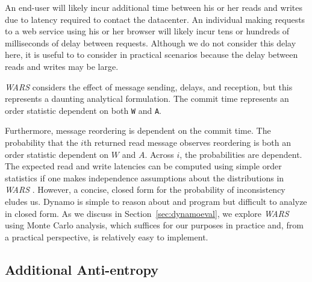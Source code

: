 \documentclass{vldb}
\begin{document}
An end-user will likely incur additional time between his or her
reads and writes due to latency required to contact the datacenter.
An individual making requests to a web service using his or her
browser will likely incur tens or hundreds of milliseconds of delay
between requests.  Although we do not consider this delay here, it is
useful to to consider in practical scenarios because the delay between
reads and writes may be large.

\textit{WARS} considers the effect of message sending, delays, and
reception, but this represents a daunting analytical formulation.  The
commit time represents an order statistic dependent on both \texttt{W}
and \texttt{A}.  Furthermore, message reordering is
dependent on the commit time.  The probability that the $i$th returned
read message observes reordering is both an order statistic dependent
on $W$ and $A$.  Across $i$, the probabilities are dependent.  The
expected read and write latencies can be computed using simple order
statistics if one makes independence assumptions about the
distributions in \textit{WARS} .  However, a concise, closed form for
the probability of inconsistency eludes us.  Dynamo is simple to
reason about and program but difficult to analyze in closed form.  As
we discuss in Section~\ref{sec:dynamoeval}, we explore \textit{WARS}
using Monte Carlo analysis, which suffices for our purposes in
practice and, from a practical perspective, is relatively easy to
implement.

\subsection{Additional Anti-entropy}
\end{document}
